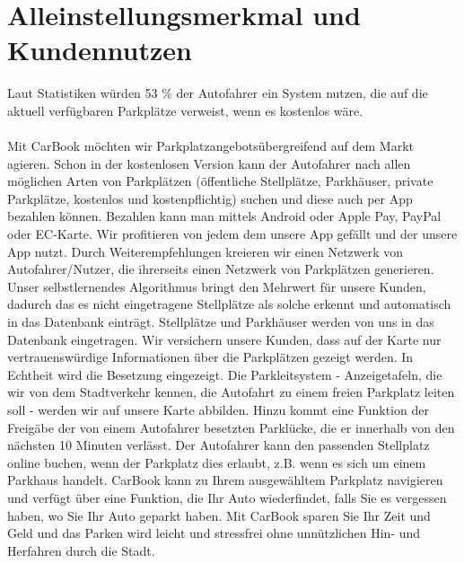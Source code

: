 \documentclass[12pt,ngerman, fleqn]{book} %
\begin{document}
\section{Alleinstellungsmerkmal und Kundennutzen}

Laut Statistiken würden 53 \% \autocite{statista4} der Autofahrer ein System nutzen, die auf die aktuell verfügbaren Parkplätze verweist, wenn es kostenlos wäre. \\ \\
Mit CarBook möchten wir Parkplatzangebotsübergreifend auf dem Markt agieren. Schon in der kostenlosen Version kann der Autofahrer nach allen möglichen Arten von Parkplätzen (öffentliche Stellplätze, Parkhäuser, private Parkplätze, kostenlos und kostenpflichtig) suchen und diese auch per App bezahlen können. Bezahlen kann man mittels Android oder Apple Pay, PayPal oder EC-Karte. Wir profitieren von jedem dem unsere App gefällt und der unsere App nutzt. Durch Weiterempfehlungen kreieren wir einen Netzwerk von Autofahrer/Nutzer, die ihrerseits einen Netzwerk von Parkplätzen generieren. Unser selbstlernendes Algorithmus bringt den Mehrwert für unsere Kunden, dadurch das es nicht eingetragene Stellplätze als solche erkennt und automatisch in das Datenbank einträgt. Stellplätze und Parkhäuser  werden von uns in das Datenbank eingetragen. Wir versichern unsere Kunden, dass  auf der Karte nur vertrauenswürdige Informationen über die Parkplätzen gezeigt werden. In Echtheit wird die Besetzung eingezeigt. Die Parkleitsystem - Anzeigetafeln, die wir von dem Stadtverkehr kennen, die Autofahrt zu einem freien Parkplatz leiten soll - werden wir auf unsere Karte abbilden. Hinzu kommt eine Funktion der Freigäbe der von einem Autofahrer besetzten Parklücke, die er innerhalb von den nächsten 10 Minuten verlässt. Der Autofahrer kann den passenden Stellplatz online buchen, wenn der Parkplatz dies erlaubt, z.B. wenn es sich um einem Parkhaus handelt. CarBook kann zu Ihrem ausgewähltem Parkplatz navigieren und verfügt über eine Funktion, die Ihr Auto wiederfindet, falls Sie es vergessen haben, wo Sie Ihr Auto geparkt haben. Mit CarBook sparen Sie Ihr Zeit und Geld und das Parken wird leicht und stressfrei ohne unnützlichen Hin- und Herfahren durch die Stadt. 
\end{document}
